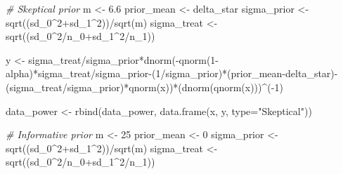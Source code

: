 \documentclass[
]{book}
\newenvironment{Shaded}{\begin{snugshade}}{\end{snugshade}}
\newcommand{\AttributeTok}[1]{\textcolor[rgb]{0.77,0.63,0.00}{#1}}
\newcommand{\CommentTok}[1]{\textcolor[rgb]{0.56,0.35,0.01}{\textit{#1}}}
\newcommand{\DecValTok}[1]{\textcolor[rgb]{0.00,0.00,0.81}{#1}}
\newcommand{\FloatTok}[1]{\textcolor[rgb]{0.00,0.00,0.81}{#1}}
\newcommand{\FunctionTok}[1]{\textcolor[rgb]{0.00,0.00,0.00}{#1}}
\newcommand{\NormalTok}[1]{#1}
\newcommand{\OtherTok}[1]{\textcolor[rgb]{0.56,0.35,0.01}{#1}}
\newcommand{\SpecialCharTok}[1]{\textcolor[rgb]{0.00,0.00,0.00}{#1}}
\newcommand{\StringTok}[1]{\textcolor[rgb]{0.31,0.60,0.02}{#1}}
\begin{document}
\begin{Shaded}
\begin{Highlighting}[]
\CommentTok{\# Skeptical prior}
\NormalTok{m }\OtherTok{\textless{}{-}} \FloatTok{6.6}
\NormalTok{prior\_mean }\OtherTok{\textless{}{-}}\NormalTok{ delta\_star}
\NormalTok{sigma\_prior }\OtherTok{\textless{}{-}} \FunctionTok{sqrt}\NormalTok{((sd\_0}\SpecialCharTok{\^{}}\DecValTok{2}\SpecialCharTok{+}\NormalTok{sd\_1}\SpecialCharTok{\^{}}\DecValTok{2}\NormalTok{))}\SpecialCharTok{/}\FunctionTok{sqrt}\NormalTok{(m)}
\NormalTok{sigma\_treat }\OtherTok{\textless{}{-}} \FunctionTok{sqrt}\NormalTok{((sd\_0}\SpecialCharTok{\^{}}\DecValTok{2}\SpecialCharTok{/}\NormalTok{n\_0}\SpecialCharTok{+}\NormalTok{sd\_1}\SpecialCharTok{\^{}}\DecValTok{2}\SpecialCharTok{/}\NormalTok{n\_1))}

\NormalTok{y }\OtherTok{\textless{}{-}}\NormalTok{ sigma\_treat}\SpecialCharTok{/}\NormalTok{sigma\_prior}\SpecialCharTok{*}\FunctionTok{dnorm}\NormalTok{(}\SpecialCharTok{{-}}\FunctionTok{qnorm}\NormalTok{(}\DecValTok{1}\SpecialCharTok{{-}}\NormalTok{alpha)}\SpecialCharTok{*}\NormalTok{sigma\_treat}\SpecialCharTok{/}\NormalTok{sigma\_prior}\SpecialCharTok{{-}}\NormalTok{(}\DecValTok{1}\SpecialCharTok{/}\NormalTok{sigma\_prior)}\SpecialCharTok{*}\NormalTok{(prior\_mean}\SpecialCharTok{{-}}\NormalTok{delta\_star)}\SpecialCharTok{{-}}\NormalTok{(sigma\_treat}\SpecialCharTok{/}\NormalTok{sigma\_prior)}\SpecialCharTok{*}\FunctionTok{qnorm}\NormalTok{(x))}\SpecialCharTok{*}\NormalTok{(}\FunctionTok{dnorm}\NormalTok{(}\FunctionTok{qnorm}\NormalTok{(x)))}\SpecialCharTok{\^{}}\NormalTok{(}\SpecialCharTok{{-}}\DecValTok{1}\NormalTok{)}

\NormalTok{data\_power }\OtherTok{\textless{}{-}} \FunctionTok{rbind}\NormalTok{(data\_power, }\FunctionTok{data.frame}\NormalTok{(x, y, }\AttributeTok{type=}\StringTok{"Skeptical"}\NormalTok{))}

\CommentTok{\# Informative prior}
\NormalTok{m }\OtherTok{\textless{}{-}} \DecValTok{25}
\NormalTok{prior\_mean }\OtherTok{\textless{}{-}} \DecValTok{0}
\NormalTok{sigma\_prior }\OtherTok{\textless{}{-}} \FunctionTok{sqrt}\NormalTok{((sd\_0}\SpecialCharTok{\^{}}\DecValTok{2}\SpecialCharTok{+}\NormalTok{sd\_1}\SpecialCharTok{\^{}}\DecValTok{2}\NormalTok{))}\SpecialCharTok{/}\FunctionTok{sqrt}\NormalTok{(m)}
\NormalTok{sigma\_treat }\OtherTok{\textless{}{-}} \FunctionTok{sqrt}\NormalTok{((sd\_0}\SpecialCharTok{\^{}}\DecValTok{2}\SpecialCharTok{/}\NormalTok{n\_0}\SpecialCharTok{+}\NormalTok{sd\_1}\SpecialCharTok{\^{}}\DecValTok{2}\SpecialCharTok{/}\NormalTok{n\_1))}


\end{Highlighting}
\end{Shaded}
\end{document}
